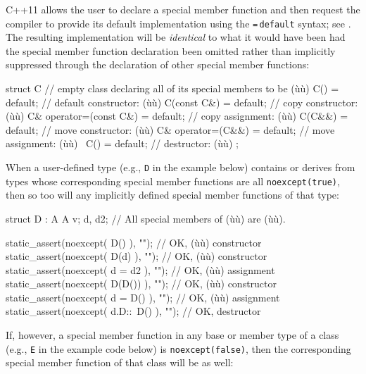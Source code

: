 \noindent C++11 allows the user to declare a special member function and then
request the compiler to provide its default implementation using the
\lstinline!=!\,\lstinline!default! syntax; see . The
resulting implementation will be \emph{identical} to what it would have
been had the special member function declaration been omitted rather
than implicitly suppressed through the declaration of other special
member functions:

\begin{emcppslisting}[emcppsbatch=e6]
struct C  // empty class declaring all of its special members to be (ù{}ù)
{
    C()                    = default;  // default constructor: (ù{}ù)
    C(const C&)            = default;  // copy constructor:    (ù{}ù)
    C& operator=(const C&) = default;  // copy assignment:     (ù{}ù)
    C(C&&)                 = default;  // move constructor:    (ù{}ù)
    C& operator=(C&&)      = default;  // move assignment:     (ù{}ù)
    ~C()                   = default;  // destructor:          (ù{}ù)
};
\end{emcppslisting}
    

\noindent When a user-defined type (e.g., \lstinline!D! in the example below)
contains or derives from types whose corresponding special member
functions are all \lstinline!noexcept(true)!, then so too will any
implicitly defined special member functions of that type:

\begin{emcppslisting}[emcppsbatch=e6]
struct D : A { A v; } d, d2;  // All special members of (ù{}ù) are (ù{}ù).

static_assert(noexcept( D()       ), "");  // OK, (ù{}ù) constructor
static_assert(noexcept( D(d)      ), "");  // OK, (ù{}ù) constructor
static_assert(noexcept( d = d2    ), "");  // OK, (ù{}ù) assignment
static_assert(noexcept( D(D())    ), "");  // OK, (ù{}ù) constructor
static_assert(noexcept( d = D()   ), "");  // OK, (ù{}ù) assignment
static_assert(noexcept( d.D::~D() ), "");  // OK, destructor
\end{emcppslisting}
    

\noindent If, however, a special member function in any base or member type of a
class (e.g., \lstinline!E! in the example code below) is
\lstinline!noexcept(false)!, then the corresponding special member function
of that class will be as well:


